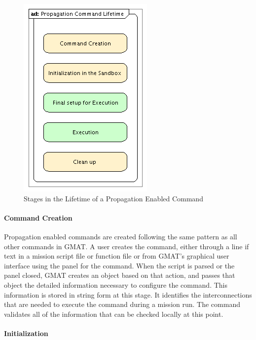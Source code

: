 \documentclass[10pt]{article}
\begin{document}
\begin{figure}[htb]
\begin{center}
\includegraphics[125,190]{Images/PropagationCommandLifetime.png}
\caption{Stages in the Lifetime of a Propagation Enabled Command}
\label{fig:PropLifetime}
\end{center}
\end{figure}

\paragraph{Command Creation}

Propagation enabled commands are created following the same pattern as all other commands in GMAT.
A user creates the command, either through a line if text in a mission script file or function file
or from GMAT's graphical user interface using the panel for the command.  When the script is parsed
or the panel closed, GMAT creates an object based on that action, and passes that object the
detailed information necessary to configure the command.  This information is stored in string form
at this stage.  It identifies the interconnections that are needed to execute the command during a
mission run.  The command validates all of the information that can be checked locally at this
point.

\paragraph{Initialization}
\end{document}
